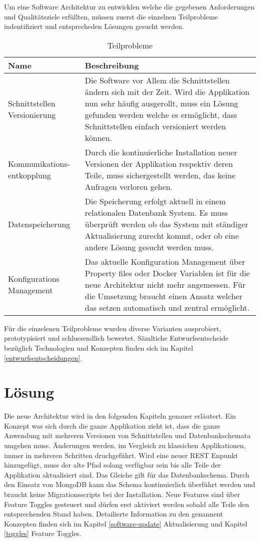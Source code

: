 Um eine Software Architektur zu entwicklen welche die gegebenen Anforderungen und Qualitätsziele erfüllten, müssen zuerst die einzelnen Teilprobleme indentifiziert und entsprecheden Lösungen gesucht werden.

\begin{table}[H]
	\centering
	\caption{Teilprobleme}
	\begin{tabular}{ | p{4cm} | p{12cm} | }
		\toprule
		{\textbf{Name}} & {\textbf{Beschreibung}} \\
		\midrule
		Schnittstellen Versionierung & Die Software vor Allem die Schnittstellen ändern sich mit der Zeit. Wird die Applikation nun sehr häufig ausgerollt, muss ein Lösung gefunden werden welche es ermöglicht, dass Schnittstellen einfach versioniert werden können.\\ \hline
		Kommunikations- entkopplung &  Durch die kontinuierliche Installation neuer Versionen der Applikation respektiv deren Teile, muss sichergestellt werden, das keine Anfragen verloren gehen.\\ \hline
		Datenspeicherung &  Die Speicherung erfolgt aktuell in einem relationalen Datenbank System. Es muss überprüft werden ob das System mit ständiger Aktualisierung zurecht kommt, oder ob eine andere Lösung gesucht werden muss.\\ \hline
		Konfigurations Management & Das aktuelle Konfiguration Management über Property files oder Docker Variablen ist für die neue Architektur nicht mehr angemessen. Für die Umsetzung braucht einen Ansatz welcher das setzen automatisch und zentral ermöglicht. \\
		\bottomrule
	\end{tabular}
\end{table}

Für die einzelenen Teilprobleme wurden diverse Varianten ausprobiert, prototypisiert und schlussendlich bewertet. Sämltiche Entwurfsentscheide bezüglich Technologien und Konzepten finden sich im Kapitel \ref{entwurfsentscheidungen}.

\section{Lösung}

Die neue Architektur wird in den folgenden Kapiteln genauer erläutert. Ein Konzept was sich durch die ganze Applikation zieht ist, dass die ganze Anwendung mit mehreren Versionen von Schnittstellen und Datenbankschemata umgehen muss. Änderungen werden, im Vergleich zu klassichen Applikationen, immer in mehreren Schritten druchgeführt. Wird eine neuer REST Enpunkt hinzugefügt, muss der alte Pfad solang verfügbar sein bis alle Teile der Applikation aktualisiert sind. Das Gleiche gilt für das Datenbankschema. Durch den Einsatz von MongoDB kann das Schema kontinuierlich überführt werden und braucht keine Migrationsscripts bei der Installation. Neue Features sind über Feature Toggles gesteuert und dürfen erst aktiviert werden sobald alle Teile den entsprechenden Stand haben. Detailierte Information zu den genannent Konzepten finden sich im Kapitel \ref{software-update} Aktualisierung und Kapitel \ref{toggles} Feature Toggles.
\newpage